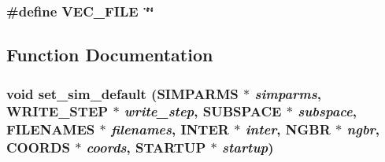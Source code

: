 \subsubsection{\setlength{\rightskip}{0pt plus 5cm}\#define VEC\_\-FILE~\char`\"{}\char`\"{}}\label{thomas_2md__setsimdef_8c_93c7c63bc0386531b54206dd2195bd73}




\subsection{Function Documentation}
\subsubsection{\setlength{\rightskip}{0pt plus 5cm}void set\_\-sim\_\-default ({\bf SIMPARMS} $\ast$ {\em simparms}, {\bf WRITE\_\-STEP} $\ast$ {\em write\_\-step}, {\bf SUBSPACE} $\ast$ {\em subspace}, {\bf FILENAMES} $\ast$ {\em filenames}, {\bf INTER} $\ast$ {\em inter}, {\bf NGBR} $\ast$ {\em ngbr}, {\bf COORDS} $\ast$ {\em coords}, {\bf STARTUP} $\ast$ {\em startup})}\label{thomas_2md__setsimdef_8c_d777c0223db2b66ed56581a0dccb8723}


